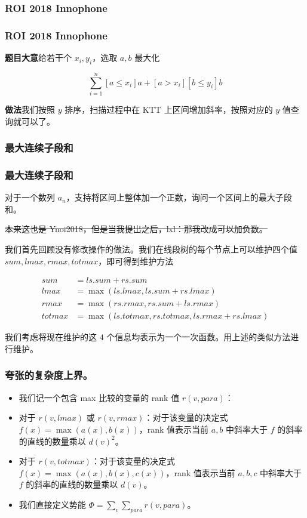 \documentclass[mathserif]{ctexbeamer}
\begin{document}
\subsubsection{ROI 2018 Innophone}
\frame
{
  \frametitle{ROI 2018 Innophone}
  
  \textbf{题目大意}\quad 给若干个 $x_i, y_i$，选取 $a, b$ 最大化
  
  $$ \sum_{i=1}^n [a\le x_i]a + [a > x_i][b\le y_i]b $$
  
  \textbf{做法}\quad 我们按照 $y$ 排序，扫描过程中在 KTT 上区间增加斜率，按照对应的 $y$ 值查询就可以了。
}

\subsubsection{最大连续子段和}
\frame
{
  \frametitle{最大连续子段和}
  
  对于一个数列 $a_n$，支持将区间上整体加一个正数，询问一个区间上的最大子段和。
  
  \sout{本来这也是 Ynoi2018，但是当我提出之后，lxl：那我改成可以加负数。}
}

\frame
{
  我们首先回顾没有修改操作的做法。我们在线段树的每个节点上可以维护四个值 $sum, lmax, rmax, totmax$，即可得到维护方法

\begin{align*}
sum &= ls.sum + rs.sum\\
lmax &= \max(ls.lmax, ls.sum+rs.lmax)\\
rmax &= \max(rs.rmax, rs.sum+ls.rmax)\\
totmax &= \max(ls.totmax, rs.totmax, ls.rmax + rs.lmax)
\end{align*}

  我们考虑将现在维护的这 $4$ 个信息均表示为一个一次函数。用上述的类似方法进行维护。
}

\frame
{
  \frametitle{夸张的复杂度上界。}
  
\begin{itemize}
\item<1->我们记一个包含 max 比较的变量的 rank 值 $r(v, para)$：

\item<2->对于 $r(v, lmax)$ 或 $r(v, rmax)$：对于该变量的决定式 $f(x) = \max(a(x), b(x))$，rank 值表示当前 $a, b$ 中斜率大于 $f$ 的斜率的直线的数量乘以 $d(v)^2$。
\item<3->对于 $r(v, totmax)$：对于该变量的决定式 $f(x) = \max(a(x), b(x), c(x))$，rank 值表示当前 $a, b, c$ 中斜率大于 $f$ 的斜率的直线的数量乘以 $d(v)$。

\item<4->我们直接定义势能 $\Phi = \sum_v \sum_{para} r(v, para)$。
\end{itemize}
}
\end{document}

